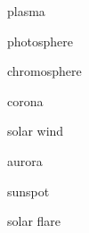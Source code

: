 \documentclass{article}
\begin{document}
\gls{plasma}

\gls{photosphere}

\gls{chromosphere}

\gls{corona}

\gls{solar wind}

\gls{aurora}

\gls{sunspot}

\gls{solar flare}

\clearpage

\printglossaries
\end{document}
